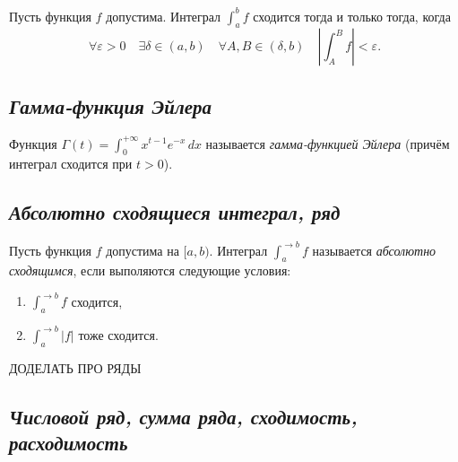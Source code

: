 \begin{theorem} \hypertarget{Критерий Больцано -- Коши сходимости несобственного интеграла}{}
	Пусть функция \(f\) допустима. Интеграл \(\int_a^b f\) сходится тогда и только тогда, когда \[
		\forall \varepsilon > 0 \quad \exists \delta \in (a, b) \quad \forall A, B \in (\delta, b) \quad \left|\int_A^B f \right| < \varepsilon.
	\]
\end{theorem}

\subsection{\itshape Гамма-функция Эйлера}

\begin{definition}
	Функция \(\displaystyle \Gamma(t) = \int_{0}^{+\infty} x^{t - 1} e^{-x} \, dx\) называется \textit{гамма-функцией Эйлера} (причём интеграл сходится при \(t > 0\)).
\end{definition}

\subsection{\itshape Абсолютно сходящиеся интеграл, ряд}

\begin{definition}
	Пусть функция \(f\) допустима на \([a, b)\). Интеграл \(\int_{a}^{\to b} f\) называется \textit{абсолютно сходящимся}, если выполяются следующие условия:
	\begin{enumerate}
		\item \(\int_{a}^{\to b} f\) сходится,
		\item \(\int_{a}^{\to b} |f|\) тоже сходится.
	\end{enumerate}
\end{definition}

ДОДЕЛАТЬ ПРО РЯДЫ

\subsection{\itshape Числовой ряд, сумма ряда, сходимость, расходимость}

